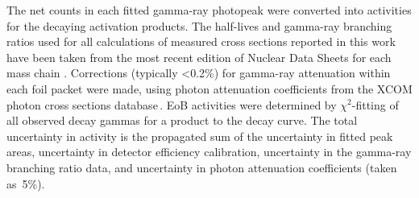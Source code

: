The net  counts in each fitted gamma-ray photopeak were converted into  activities for the decaying  activation products.
% 
% 
% 
The   half-lives and gamma-ray branching ratios  used for all calculations of measured cross sections reported in this work  have been taken from the most recent edition of  Nuclear Data Sheets for each  mass chain
\cite{Singh2015a,Chen2011a,Wu2000,Burrows2007,Burrows2006,Burrows2008,Wang2017,Dong2015,Dong2014,JUNDE2008787,Junde2011,Bhat1998,Nesaraja2010,Browne2013,Zuber20151,NICHOLS2012973,ERJUN2001,Singh2007}.
Corrections (typically \textless0.2\%) for gamma-ray attenuation within each foil packet were made, using  photon attenuation coefficients from the XCOM photon cross sections database\,\cite{berger2011xcom}.
EoB activities were determined by $\chi^2$-fitting of all observed decay gammas for a product to the decay curve.
The total  uncertainty in  activity is the propagated sum of the uncertainty in  fitted peak areas, uncertainty in detector efficiency calibration,  uncertainty in the gamma-ray branching ratio data, and uncertainty in photon attenuation coefficients (taken as~5\%).





